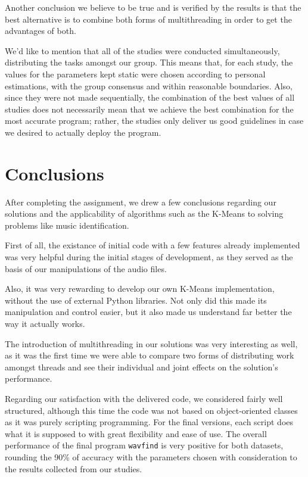 \documentclass[12pt]{article}
\begin{document}
Another conclusion we believe to be true and is verified by the results is that
the best alternative is to combine both forms of multithreading in order to get
the advantages of both.

We'd like to mention that all of the studies were conducted simultaneously,
distributing the tasks amongst our group.
This means that, for each study, the values for the parameters kept static were
chosen according to personal estimations, with the group consensus and within
reasonable boundaries.
Also, since they were not made sequentially, the combination of the best values
of all studies does not necessarily mean that we achieve the best combination for
the most accurate program; rather, the studies only deliver us good guidelines
in case we desired to actually deploy the program.

\newpage

\section*{Conclusions}

After completing the assignment, we drew a few conclusions regarding our 
solutions and the applicability of algorithms such as the K-Means to solving
problems like music identification.

First of all, the existance of initial code with a few features already 
implemented was very helpful during the initial stages of development, as they 
served as the basis of our manipulations of the audio files.

Also, it was very rewarding to develop our own K-Means implementation, without 
the use of external Python libraries. 
Not only did this made its manipulation and control easier, but it also made us 
understand far better the way it actually works.

The introduction of multithreading in our solutions was very interesting as well,
as it was the first time we were able to compare two forms of distributing work
amongst threads and see their individual and joint effects on the solution's 
performance.

Regarding our satisfaction with the delivered code, we considered fairly well 
structured, although this time the code was not based on object-oriented classes
as it was purely scripting programming.
For the final versions, each script does what it is supposed to with great 
flexibility and ease of use.
The overall performance of the final program \texttt{wavfind} is very positive for both
datasets, rounding the 90\% of accuracy with the parameters chosen with 
consideration to the results collected from our studies.
\end{document}
